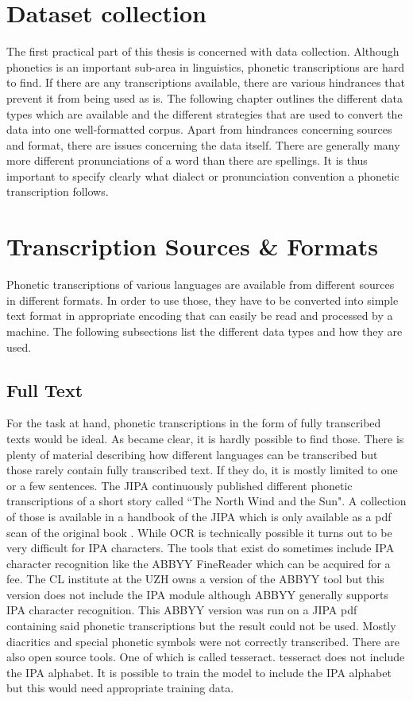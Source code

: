 
\section{Dataset collection}
\label{chap:data_collection}
The first practical part of this thesis is concerned with data collection. Although phonetics is an important sub-area in linguistics, phonetic transcriptions are hard to find. If there are any transcriptions available, there are various hindrances that prevent it from being used as is. The following chapter outlines the different data types which are available and the different strategies that are used to convert the data into one well-formatted corpus. Apart from hindrances concerning sources and format, there are issues concerning the data itself. There are generally many more different pronunciations of a word than there are spellings. It is thus important to specify clearly what dialect or pronunciation convention a phonetic transcription follows. 


\section{Transcription Sources \& Formats}
Phonetic transcriptions of various languages are available from different sources in different formats. In order to use those, they have to be converted into simple text format in appropriate encoding that can easily be read and processed by a machine. The following subsections list the different data types and how they are used.

\subsection{Full Text}
For the task at hand, phonetic transcriptions in the form of fully transcribed texts would be ideal. As became clear, it is hardly possible to find those. There is plenty of material describing how different languages can be transcribed but those rarely contain fully transcribed text. If they do, it is mostly limited to one or a few sentences. The JIPA continuously published different phonetic transcriptions of a short story called ``The North Wind and the Sun". A collection of those is available in a handbook of the JIPA which is only available as a pdf scan of the original book \citep{JIPA2010}. While OCR is technically possible it turns out to be very difficult for IPA characters. The tools that exist do sometimes include IPA character recognition like the ABBYY FineReader which can be acquired for a fee. The CL institute at the UZH owns a version of the ABBYY tool but this version does not include the IPA module although ABBYY generally supports IPA character recognition. This ABBYY version was run on a JIPA pdf containing said phonetic transcriptions but the result could not be used. Mostly diacritics and special phonetic symbols were not correctly transcribed. There are also open source tools. One of which is called tesseract. tesseract does not include the IPA alphabet. It is possible to train the model to include the IPA alphabet but this would need appropriate training data. 



